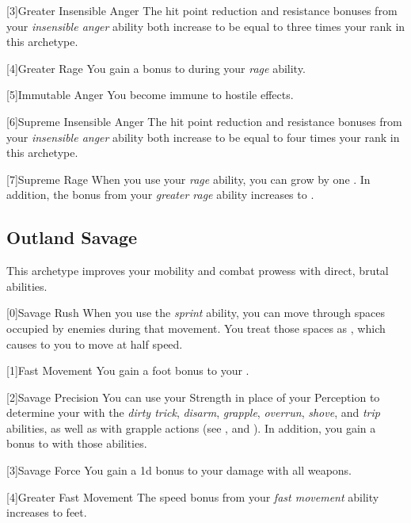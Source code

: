         [3]{Greater Insensible Anger} The hit point reduction and resistance bonuses from your \textit{insensible anger} ability both increase to be equal to three times your rank in this archetype.

        [4]{Greater Rage} You gain a  bonus to  during your \textit{rage} ability.

        [5]{Immutable Anger} You become immune to hostile  effects.

        [6]{Supreme Insensible Anger} The hit point reduction and resistance bonuses from your \textit{insensible anger} ability both increase to be equal to four times your rank in this archetype.

        [7]{Supreme Rage} When you use your \textit{rage} ability, you can grow by one .
        In addition, the  bonus from your \textit{greater rage} ability increases to .

    \newpage
    \subsection{Outland Savage}
        This archetype improves your mobility and combat prowess with direct, brutal abilities.

        [0]{Savage Rush} When you use the \textit{sprint} ability, you can move through spaces occupied by enemies during that movement.
        You treat those spaces as , which causes to you to move at half speed.

        [1]{Fast Movement} You gain a  foot bonus to your .

        [2]{Savage Precision} You can use your Strength in place of your Perception to determine your  with the \textit{dirty trick}, \textit{disarm}, \textit{grapple}, \textit{overrun}, \textit{shove}, and \textit{trip} abilities, as well as with grapple actions (see , and ).
        In addition, you gain a  bonus to  with those abilities.

        [3]{Savage Force} You gain a \plus1d bonus to your damage with all weapons.

        [4]{Greater Fast Movement} The speed bonus from your \textit{fast movement} ability increases to  feet.

